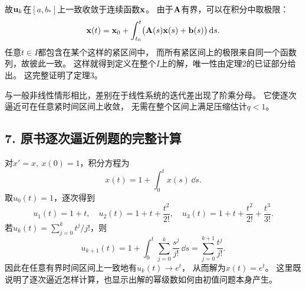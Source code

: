 故$\vect{u}_k$在$[a,b_*]$上一致收敛于连续函数$\vect{x}$。
由于$\mathbf{A}$有界，可以在积分中取极限：
\[
 \vect{x}(t)=\vect{x}_0+\int_{t_0}^t\bigl(\mat{A}(s)\vect{x}(s)+\vect{b}(s)\bigr)\,\dd s.
\]
任意$t\in I$都包含在某个这样的紧区间中，
而所有紧区间上的极限来自同一个函数列，故彼此一致。
这样就得到定义在整个$I$上的解，唯一性由定理2的已证部分给出。
这完整证明了定理3。

与一般非线性情形相比，差别在于线性系统的迭代差出现了阶乘分母。
它使逐次逼近可在任意紧时间区间上收敛，
无需在整个区间上满足压缩估计$q<1$。

\subsection*{7. 原书逐次逼近例题的完整计算}

对$x'=x,\ x(0)=1$，积分方程为
\[
 x(t)=1+\int_0^t x(s)\,\dd s.
\]
取$u_0(t)=1$，逐次得到
\[
 u_1(t)=1+t,\quad
 u_2(t)=1+t+\frac{t^2}{2!},\quad
 u_3(t)=1+t+\frac{t^2}{2!}+\frac{t^3}{3!}.
\]
若$u_k(t)=\sum_{j=0}^k t^j/j!$，则
\[
 u_{k+1}(t)
 =1+\int_0^t\sum_{j=0}^k\frac{s^j}{j!}\,\dd s
 =\sum_{j=0}^{k+1}\frac{t^j}{j!}.
\]
因此在任意有界时间区间上一致地有$u_k(t)\to e^t$，
从而解为$x(t)=e^t$。
这里既说明了逐次逼近怎样计算，也显示出解的幂级数如何由初值问题本身产生。
